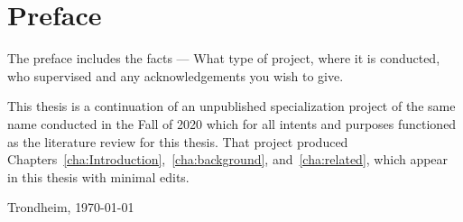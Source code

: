 \chapter*{Preface}
\vspace{1cm}
The preface includes the facts --- What type of project, where it is conducted, who supervised and any acknowledgements you wish to give. 

This thesis is a continuation of an unpublished specialization project of the same name conducted in the Fall of 2020 which for all intents and purposes functioned as the literature review for this thesis. That project produced Chapters~\ref{cha:Introduction},~\ref{cha:background}, and~\ref{cha:related}, which appear in this thesis with minimal edits.
\vfill
\begin{flushright}
    \thesisAuthor\par
    Trondheim, {\usdate\today}
\end{flushright}